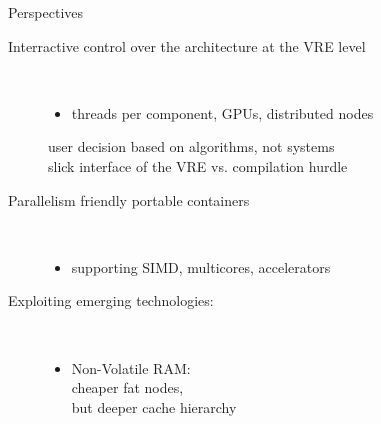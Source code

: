 \documentclass{beamer}
\newcommand{\thus}{\textcolor{red}{\MVRightarrow{}}\xspace}
\begin{document}
\begin{frame} {Perspectives}

  \begin{description}
  \item[Interractive control over the architecture at the VRE level]\
    \begin{itemize}
    \item threads per component, GPUs, distributed nodes
    \end{itemize}
      \thus user decision based on algorithms, not systems\\
      \thus  slick interface of the VRE  vs. compilation hurdle
      
    \item[Parallelism friendly  portable containers]\
      \begin{itemize}
      \item supporting SIMD, multicores, accelerators
      \end{itemize}
    \item[Exploiting emerging technologies:]\
      \begin{itemize}
      \item Non-Volatile RAM: \\
        \thus cheaper fat nodes,\\
        \thus but deeper cache hierarchy
      \end{itemize}

    \item[]

  \end{description}
\end{frame}


\end{document}
